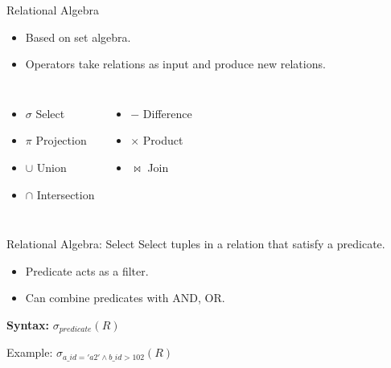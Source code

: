 \begin{frame}{Relational Algebra}
    \begin{itemize}
        \item Based on set algebra.
        \item Operators take relations as input and produce new relations.
    \end{itemize}

    \vspace{1em}
    \begin{columns}
        \begin{itemize}
            \item $\sigma$ Select
            \item $\pi$ Projection
            \item $\cup$ Union
            \item $\cap$ Intersection
        \end{itemize}

        \begin{itemize}
            \item $-$ Difference
            \item $\times$ Product
            \item $\bowtie$ Join
        \end{itemize}
    \end{columns}
\end{frame}

\begin{frame}{Relational Algebra: Select}
    Select tuples in a relation that satisfy a predicate.
    \begin{itemize}
        \item Predicate acts as a filter.
        \item Can combine predicates with AND, OR.
    \end{itemize}

    \vspace{1em}
    \textbf{Syntax:} $\sigma_{predicate}(R)$

    \vspace{1em}
    Example: $\sigma_{a\_id='a2' \land b\_id>102}(R)$
\end{frame}


